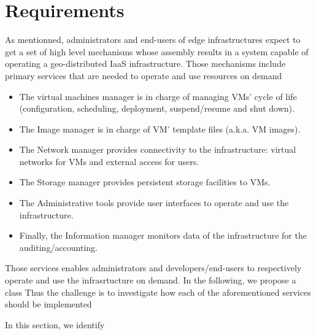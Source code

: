 \section{Requirements}
\label{sec:requirements}

As mentionned, administrators and end-users of edge infrastructures expect to get a set of high
level mechanisms whose assembly results in a system capable of
operating a geo-distributed IaaS infrastructure.
Those mechanisms include primary services that are needed to operate and use
resources on demand~\cite{moreno2012csp} 
\begin{itemize}
\item The virtual machines manager is in charge of managing VMs’ cycle
  of life (configuration, scheduling, deployment, suspend/resume and
  shut down).
\item The Image manager is in charge of VM’ template files (a.k.a. VM
  images).
\item The Network manager provides connectivity to the infrastructure:
  virtual networks for VMs and external access for users.
\item The Storage manager provides persistent storage facilities to
  VMs.
\item The Administrative tools provide user interfaces to operate and
  use the infrastructure.
\item Finally, the Information manager monitors data of the
  infrastructure for the auditing/accounting.
\end{itemize}

Those services enables administrators and developers/end-users to respectively operate and use the infrasrtucture on demand.
In the following, we propose a class
Thus the challenge is to investigate how each of the aforementioned services should be implemented


In this section, we identify



